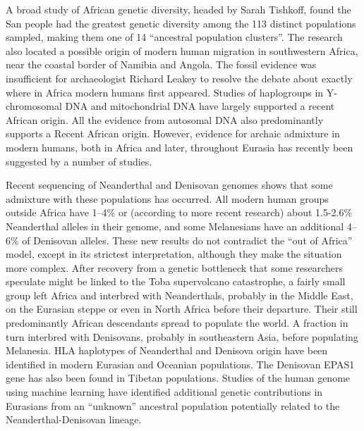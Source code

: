 A broad study of African genetic diversity, headed by Sarah Tishkoff, found the San people had the greatest genetic diversity among the 113 distinct populations sampled, making them one of 14 ``ancestral population clusters''. The research also located a possible origin of modern human migration in southwestern Africa, near the coastal border of Namibia and Angola. The fossil evidence was insufficient for archaeologist Richard Leakey to resolve the debate about exactly where in Africa modern humans first appeared. Studies of haplogroups in Y-chromosomal DNA and mitochondrial DNA have largely supported a recent African origin. All the evidence from autosomal DNA also predominantly supports a Recent African origin. However, evidence for archaic admixture in modern humans, both in Africa and later, throughout Eurasia has recently been suggested by a number of studies.

Recent sequencing of Neanderthal and Denisovan genomes shows that some admixture with these populations has occurred. All modern human groups outside Africa have 1--4\% or (according to more recent research) about 1.5-2.6\% Neanderthal alleles in their genome, and some Melanesians have an additional 4--6\% of Denisovan alleles. These new results do not contradict the ``out of Africa'' model, except in its strictest interpretation, although they make the situation more complex. After recovery from a genetic bottleneck that some researchers speculate might be linked to the Toba supervolcano catastrophe, a fairly small group left Africa and interbred with Neanderthals, probably in the Middle East, on the Eurasian steppe or even in North Africa before their departure. Their still predominantly African descendants spread to populate the world. A fraction in turn interbred with Denisovans, probably in southeastern Asia, before populating Melanesia. HLA haplotypes of Neanderthal and Denisova origin have been identified in modern Eurasian and Oceanian populations. The Denisovan EPAS1 gene has also been found in Tibetan populations. Studies of the human genome using machine learning have identified additional genetic contributions in Eurasians from an ``unknown'' ancestral population potentially related to the Neanderthal-Denisovan lineage.



